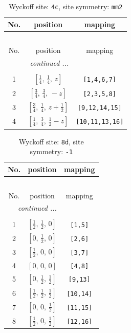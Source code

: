 \documentclass[fleqn,8pt]{jsarticle}
\begin{document}
\renewcommand{\arraystretch}{1.2}
\begin{longtable}{ccc}
\caption{Wyckoff site: {\tt 4c}, site symmetry: {\tt mm2}}
 \\
 \hline \hline
No. & position & mapping \\ \hline \endfirsthead

\multicolumn{2}{l}{\tablename\ \thetable{}} \\
 \hline \hline
No. & position & mapping \\ \hline \endhead

 \hline \hline
\multicolumn{2}{r}{\footnotesize\it continued ...} \\ \endfoot

 \hline \hline
\multicolumn{2}{r}{} \\ \endlastfoot

1 & $\left[ \frac{1}{4},\, \frac{1}{4},\, z \right]$ & {\tt [1,4,6,7]} \\ \hline
2 & $\left[ \frac{3}{4},\, \frac{3}{4},\, - z \right]$ & {\tt [2,3,5,8]} \\ \hline
3 & $\left[ \frac{3}{4},\, \frac{1}{4},\, z + \frac{1}{2} \right]$ & {\tt [9,12,14,15]} \\ \hline
4 & $\left[ \frac{1}{4},\, \frac{3}{4},\, \frac{1}{2} - z \right]$ & {\tt [10,11,13,16]} \\
\end{longtable}
\renewcommand{\arraystretch}{1.2}
\begin{longtable}{ccc}
\caption{Wyckoff site: {\tt 8d}, site symmetry: {\tt -1}}
 \\
 \hline \hline
No. & position & mapping \\ \hline \endfirsthead

\multicolumn{2}{l}{\tablename\ \thetable{}} \\
 \hline \hline
No. & position & mapping \\ \hline \endhead

 \hline \hline
\multicolumn{2}{r}{\footnotesize\it continued ...} \\ \endfoot

 \hline \hline
\multicolumn{2}{r}{} \\ \endlastfoot

1 & $\left[ \frac{1}{2},\, \frac{1}{2},\, 0 \right]$ & {\tt [1,5]} \\ \hline
2 & $\left[ 0,\, \frac{1}{2},\, 0 \right]$ & {\tt [2,6]} \\ \hline
3 & $\left[ \frac{1}{2},\, 0,\, 0 \right]$ & {\tt [3,7]} \\ \hline
4 & $\left[ 0,\, 0,\, 0 \right]$ & {\tt [4,8]} \\ \hline
5 & $\left[ 0,\, \frac{1}{2},\, \frac{1}{2} \right]$ & {\tt [9,13]} \\ \hline
6 & $\left[ \frac{1}{2},\, \frac{1}{2},\, \frac{1}{2} \right]$ & {\tt [10,14]} \\ \hline
7 & $\left[ 0,\, 0,\, \frac{1}{2} \right]$ & {\tt [11,15]} \\ \hline
8 & $\left[ \frac{1}{2},\, 0,\, \frac{1}{2} \right]$ & {\tt [12,16]} \\
\end{longtable}
\end{document}
